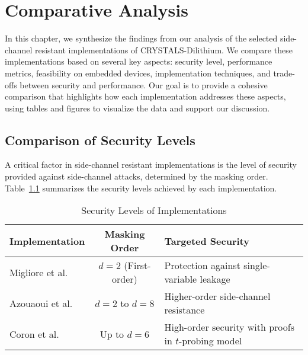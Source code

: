 
\chapter{Comparative Analysis}
\thispagestyle{chapterstart}

In this chapter, we synthesize the findings from our analysis of the selected side-channel resistant implementations of CRYSTALS-Dilithium. We compare these implementations based on several key aspects: security level, performance metrics, feasibility on embedded devices, implementation techniques, and trade-offs between security and performance. Our goal is to provide a cohesive comparison that highlights how each implementation addresses these aspects, using tables and figures to visualize the data and support our discussion.

\section{Comparison of Security Levels}

A critical factor in side-channel resistant implementations is the level of security provided against side-channel attacks, determined by the masking order. Table~\ref{tab:security_levels} summarizes the security levels achieved by each implementation.

\begin{table}[h]
    \centering
    \renewcommand{\arraystretch}{1.2} %
    \caption{Security Levels of Implementations}
    \begin{tabular}{l | c | p{7cm}} %
        \toprule
        \textbf{Implementation}            & \textbf{Masking Order} & \textbf{Targeted Security}                           \\
        \midrule
        Migliore et al.\ \cite{Migliore19} & $d = 2$ (First-order)  & Protection against single-variable leakage           \\
        Azouaoui et al.\ \cite{Azouaoui22} & $d = 2$ to $d = 8$     & Higher-order side-channel resistance                 \\
        Coron et al.\ \cite{Coron23}       & Up to $d = 6$          & High-order security with proofs in $t$-probing model \\
        \bottomrule
    \end{tabular}
    \label{tab:security_levels}
\end{table}




